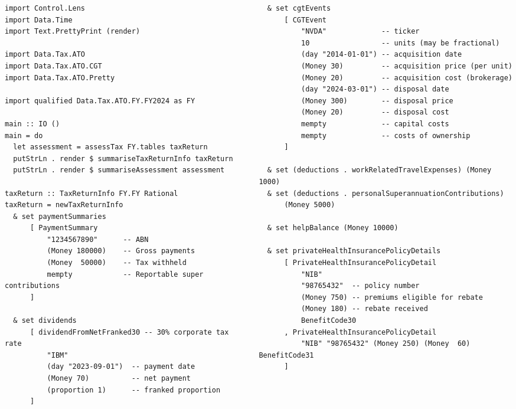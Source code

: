 \documentclass[ignorenonframetext,aspectratio=169,12pt]{beamer}
\begin{document}
\begin{frame}
\tiny
\begin{columns}[t]
  \begin{column}{.5\textwidth}
\begin{verbatim}
import Control.Lens
import Data.Time
import Text.PrettyPrint (render)

import Data.Tax.ATO
import Data.Tax.ATO.CGT
import Data.Tax.ATO.Pretty

import qualified Data.Tax.ATO.FY.FY2024 as FY

main :: IO ()
main = do
  let assessment = assessTax FY.tables taxReturn
  putStrLn . render $ summariseTaxReturnInfo taxReturn
  putStrLn . render $ summariseAssessment assessment

taxReturn :: TaxReturnInfo FY.FY Rational
taxReturn = newTaxReturnInfo
  & set paymentSummaries
      [ PaymentSummary
          "1234567890"      -- ABN
          (Money 180000)    -- Gross payments
          (Money  50000)    -- Tax withheld
          mempty            -- Reportable super contributions
      ]

  & set dividends
      [ dividendFromNetFranked30 -- 30% corporate tax rate
          "IBM"
          (day "2023-09-01")  -- payment date
          (Money 70)          -- net payment
          (proportion 1)      -- franked proportion
      ]
\end{verbatim}
  \end{column}

  \begin{column}{.5\textwidth}
\begin{verbatim}
  & set cgtEvents
      [ CGTEvent
          "NVDA"             -- ticker
          10                 -- units (may be fractional)
          (day "2014-01-01") -- acquisition date
          (Money 30)         -- acquisition price (per unit)
          (Money 20)         -- acquisition cost (brokerage)
          (day "2024-03-01") -- disposal date
          (Money 300)        -- disposal price
          (Money 20)         -- disposal cost
          mempty             -- capital costs
          mempty             -- costs of ownership
      ]

  & set (deductions . workRelatedTravelExpenses) (Money 1000)
  & set (deductions . personalSuperannuationContributions)
      (Money 5000)

  & set helpBalance (Money 10000)

  & set privateHealthInsurancePolicyDetails
      [ PrivateHealthInsurancePolicyDetail
          "NIB"
          "98765432"  -- policy number
          (Money 750) -- premiums eligible for rebate
          (Money 180) -- rebate received
          BenefitCode30
      , PrivateHealthInsurancePolicyDetail
          "NIB" "98765432" (Money 250) (Money  60) BenefitCode31
      ]
\end{verbatim}
  \end{column}

\end{columns}
\end{frame}
\end{document}
